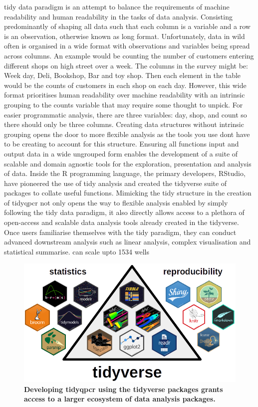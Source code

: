 \documentclass{SBCbookchapter}
\begin{document}
tidy data paradigm is an attempt to balance the requirements of machine readability and human readability in the tasks of data analysis. Consisting predominantly of shaping all data such that each column is a variable and a row is an observation, otherwise known as long format. Unfortunately, data in wild often is organised in a wide format with observations and variables being spread across columns. An example would be counting the number of customers entering different shops on high street over a week. The columns in the survey might be: Week day, Deli, Bookshop, Bar and toy shop. Then each element in the table would be the counts of customers in each shop on each day. However, this wide format prioritises human readability over machine readability with an intrinsic grouping to the counts variable that may require some thought to unpick. For easier programmatic analysis, there are three variables: day, shop, and count so there should only be three columns. Creating data structures without intrinsic grouping opens the door to more flexible analysis as the tools you use dont have to be creating to account for this structure. Ensuring all functions input and output data in a wide ungrouped form enables the development of a suite of scalable and domain agnostic tools for the exploration, presentation and analysis of data. Inside the R programming language, the primary developers, RStudio, have pioneered the use of tidy analysis and created the tidyverse suite of packages to collate useful functions. Mimicking the tidy structure in the creation of tidyqpcr not only opens the way to flexible analysis enabled by simply following the tidy data paradigm, it also directly allows access to a plethora of open-access and scalable data analysis tools already created in the tidyverse. Once users familiarise themselves with the tidy paradigm, they can conduct advanced downstream analysis such as linear analysis, complex visualisation and statistical summarise. can scale upto 1534 wells 

\begin{figure}[t]

{\centering \includegraphics[width=0.8\linewidth]{figures/tidyverse_ecosystem} 

}

\caption{\textbf{Developing tidyqpcr using the tidyverse packages grants access to a larger ecosystem of data analysis packages.}}\label{fig:tidyverse_ecosystem}
\end{figure}
\end{document}
